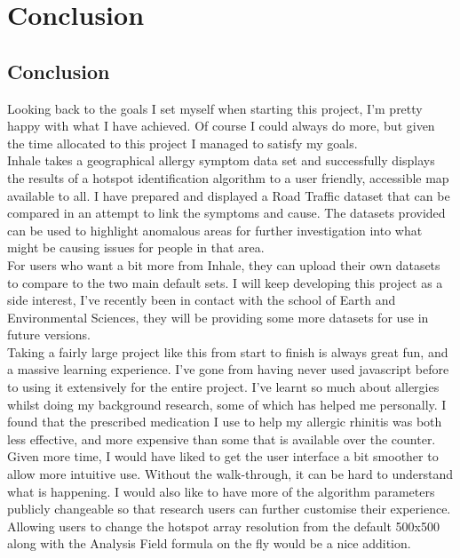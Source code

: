 \chapter{Conclusion}
\label{cha:conc}

\section{Conclusion}

Looking back to the goals I set myself when starting this project, I'm pretty happy with what I have achieved. Of course I could always do more, but given the time allocated to this project I managed to satisfy my goals.\\

Inhale takes a geographical allergy symptom data set and successfully displays the results of a hotspot identification algorithm to a user friendly, accessible map available to all. I have prepared and displayed a Road Traffic dataset that can be compared in an attempt to link the symptoms and cause. The datasets provided can be used to highlight anomalous areas for further investigation into what might be causing issues for people in that area.\\

For users who want a bit more from Inhale, they can upload their own datasets to compare to the two main default sets. I will keep developing this project as a side interest, I've recently been in contact with the school of Earth and Environmental Sciences, they will be providing some more datasets for use in future versions.\\

Taking a fairly large project like this from start to finish is always great fun, and a massive learning experience. I've gone from having never used javascript before to using it extensively for the entire project. I've learnt so much about allergies whilst doing my background research, some of which has helped me personally. I found that the prescribed medication I use to help my allergic rhinitis was both less effective, and more expensive than some that is available over the counter.\\

Given more time, I would have liked to get the user interface a bit smoother to allow more intuitive use. Without the walk-through, it can be hard to understand what is happening. I would also like to have more of the algorithm parameters publicly changeable so that research users can further customise their experience. Allowing users to change the hotspot array resolution from the default 500x500 along with the Analysis Field formula on the fly would be a nice addition.\\

